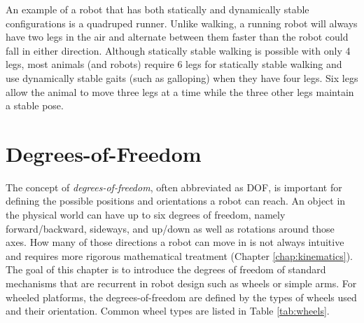 An example of a robot that has both statically and dynamically stable configurations is a quadruped runner. Unlike walking, a running robot will always have two legs in the air and alternate between them faster than the robot could fall in either direction. Although statically stable walking is possible with only 4 legs, most animals (and robots) require 6 legs for statically stable walking and use dynamically stable gaits (such as galloping) when they have four legs. Six legs allow the animal to move three legs at a time while the three other legs maintain a stable pose.


\section{Degrees-of-Freedom}\label{sec:dof}
The concept of \emph{degrees-of-freedom}, often abbreviated as DOF, is important for defining the possible positions and orientations a robot can reach. An object in the physical world can have up to six degrees of freedom, namely forward/backward, sideways, and up/down as well as rotations around those axes. How many of those directions a robot can move in is not always intuitive and requires more rigorous mathematical treatment (Chapter \ref{chap:kinematics}). The goal of this chapter is to introduce the degrees of freedom of standard mechanisms that are recurrent in robot design such as wheels or simple arms. For wheeled platforms, the degrees-of-freedom are defined by the types of wheels used and their orientation. Common wheel types are listed in Table \ref{tab:wheels}.

